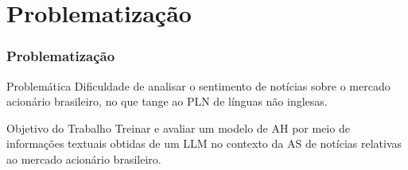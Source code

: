 \section{Problematização} %


\begin{frame}
	\frametitle{Problematização}

    \begin{alertblock}{Problemática}
    Dificuldade de analisar o sentimento de notícias sobre o mercado acionário brasileiro, no que tange ao PLN de línguas não inglesas.
    \end{alertblock}
    \bigskip
    \begin{block}{Objetivo do Trabalho}
    Treinar e avaliar um modelo de AH por meio de informações textuais obtidas de um LLM no contexto da AS de notícias relativas ao mercado acionário brasileiro.
    \end{block}

	
\end{frame}

